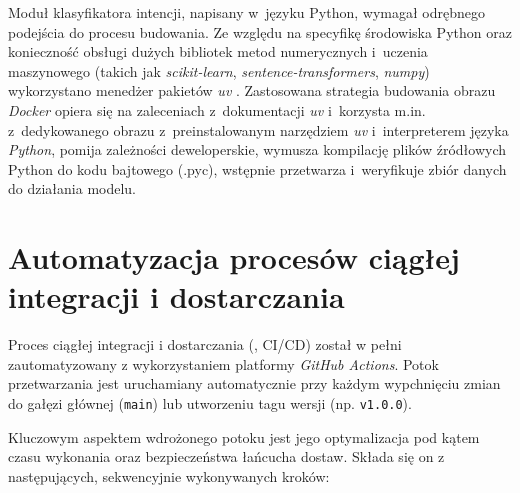 Moduł klasyfikatora intencji, napisany w~języku Python, wymagał odrębnego podejścia do procesu budowania. Ze względu na specyfikę środowiska Python oraz konieczność obsługi dużych bibliotek metod numerycznych i~uczenia maszynowego (takich jak \textit{scikit-learn}, \textit{sentence-transformers}, \textit{numpy}) wykorzystano menedżer pakietów \textit{uv} \cite{uv}. Zastosowana strategia budowania obrazu \textit{Docker} opiera się na zaleceniach z~dokumentacji \textit{uv} \cite{uv_docker} i~korzysta m.in. z~dedykowanego obrazu z~preinstalowanym narzędziem \textit{uv} i~interpreterem języka \textit{Python}, pomija zależności deweloperskie, wymusza kompilację plików źródłowych Python do kodu bajtowego (.pyc), wstępnie przetwarza i~weryfikuje zbiór danych do działania modelu.

\section{Automatyzacja procesów ciągłej integracji i dostarczania} \label{sec:cosign}

Proces ciągłej integracji i dostarczania (, CI/CD) został w pełni zautomatyzowany z wykorzystaniem platformy \textit{GitHub Actions}. Potok przetwarzania jest uruchamiany automatycznie przy każdym wypchnięciu zmian do gałęzi głównej (\texttt{main}) lub utworzeniu tagu wersji (np. \texttt{v1.0.0}).

Kluczowym aspektem wdrożonego potoku jest jego optymalizacja pod kątem czasu wykonania oraz bezpieczeństwa łańcucha dostaw. Składa się on z następujących, sekwencyjnie wykonywanych kroków:

